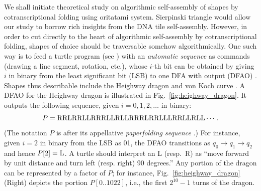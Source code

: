 \documentclass[runningheads]{llncs}
\begin{document}
We shall initiate theoretical study on algorithmic self-assembly of shapes by cotranscriptional folding using oritatami system. 
Sierpinski triangle would allow our study to borrow rich insights from the DNA tile self-assembly. 
However, in order to cut directly to the heart of algorithmic self-assembly by cotranscriptional folding, shapes of choice should be traversable somehow algorithmically. 
One such way is to feed a turtle program (see \cite{AbelsondiSessa1981}) with an \textit{automatic sequence} as commands (drawing a line segment, rotation, etc.), whose $i$-th bit can be obtained by giving $i$ in binary from the least significant bit (LSB) to one DFA with output (DFAO) \cite{AlloucheShallit2003}.
Shapes thus describable include the Heighway dragon \cite{AlloucheShallit2003} and von Koch curve \cite{MaHoldener2005}. 
A DFAO for the Heighway dragon is illustrated in Fig.~\ref{fig:heighway_dragon}. 
It outputs the following sequence, given $i = 0, 1, 2, \ldots$ in binary: 
\[
P 	= {\rm RRLRRLLRRRLLRLLRRRLRRLLLRRLLRLL} \cdots.
\]
(The notation $P$ is after its appellative \textit{paperfolding sequence} \cite{AlloucheShallit2003}.) 
For instance, given $i = 2$ in binary from the LSB as 01, the DFAO transitions as $q_0 \to q_1 \to q_2$ and hence $P[2] = {\rm L}$. 
A turtle should interpret an L (resp.~R) as ``move forward by unit distance and turn left (resp. right) 90 degrees.''
Any portion of the dragon can be represented by a factor of $P$; for instance, Fig.~\ref{fig:heighway_dragon} (Right) depicts the portion $P[0 .. 1022]$, i.e., the first $2^{10}-1$ turns of the dragon. 
\end{document}
